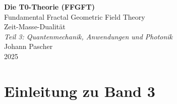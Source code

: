 

	
	\setcounter{section}{0}
	\setcounter{subsection}{0}
	\setcounter{subsubsection}{0}
	\setcounter{paragraph}{0}
	
	\setcounter{secnumdepth}{1}  %
	\makeatletter
	\renewcommand*\l@part[2]{%
		\ifnum \c@tocdepth >-2\relax
		\addpenalty{-\@highpenalty}%
		\addvspace{0.8em \@plus\p@}%
		{\leftskip 0em \relax
			\rightskip \@tocrmarg
			\parfillskip -\rightskip
			\parindent 0em \relax\@afterindenttrue
			\interlinepenalty\@M
			\leavevmode
			{\footnotesize\bfseries #1}\nobreak
			\leaders\hbox{$\m@th\mkern \@dotsep mu\hbox{}\mkern \@dotsep mu$}\hfill
			\nobreak\hb@xt@\@pnumwidth{\hss #2}\par}%
		\addvspace{0.2em \@plus\p@}%
		\nobreak
		\fi}
	\makeatother
	
	\renewcommand{\cftchapfont}{\footnotesize\bfseries}
	\renewcommand{\cftchappagefont}{\footnotesize\bfseries}
	\setlength{\cftbeforechapskip}{0.3em}
	
	\setcounter{tocdepth}{0}
	\begin{titlepage}
		\centering
		\vspace*{2cm}
		
		{\Huge\bfseries Die T0-Theorie (FFGFT)}\\[0.8cm]
		{\LARGE Fundamental Fractal Geometric Field Theory}\\[0.5cm]
		{\LARGE Zeit-Masse-Dualität}\\[1.5cm]
		
		{\Large\itshape Teil 3: Quantenmechanik, Anwendungen und Photonik}\\[2cm]
		
		{\large Johann Pascher}\\[1cm]
		
		{\large 2025}
		
		\vfill
	\end{titlepage}
	
	\frontmatter
	\pagestyle{fancy}
	\makeatletter
	\let\ps@plain\ps@fancy
	\let\ps@empty\ps@fancy
	\makeatother
	
	\mainmatter
	\pagestyle{fancy}
	
	\tableofcontents
	
	\chapter{Einleitung zu Band 3}
	
	
